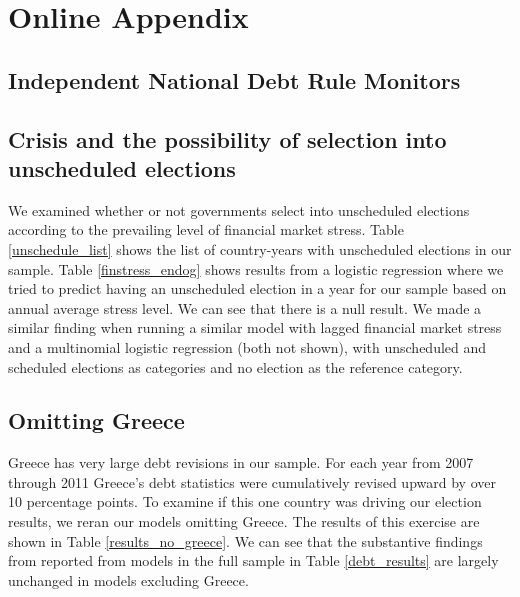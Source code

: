 \documentclass[]{article}
\begin{document}
\section*{Online Appendix}

\subsection*{Independent National Debt Rule Monitors}



\subsection*{Crisis and the possibility of selection into unscheduled elections}

We examined whether or not governments select into unscheduled elections according to the prevailing level of financial market stress. Table \ref{unschedule_list} shows the list of country-years with unscheduled elections in our sample. Table \ref{finstress_endog} shows results from a logistic regression where we tried to predict having an unscheduled election in a year for our sample based on annual average stress level. We can see that there is a null result. We made a similar finding when running a similar model with lagged financial market stress and a  multinomial logistic regression (both not shown), with unscheduled and scheduled elections as categories and no election as the reference category.





\subsection*{Omitting Greece}

Greece has very large debt revisions in our sample. For each year from 2007 through 2011 Greece's debt statistics were cumulatively revised upward by over 10 percentage points. To examine if this one country was driving our election results, we reran our models omitting Greece. The results of this exercise are shown in Table \ref{results_no_greece}. We can see that the substantive findings from reported from models in the full sample in Table \ref{debt_results} are largely unchanged in models excluding Greece.

\begin{landscape}
    
\end{landscape}
\end{document}
